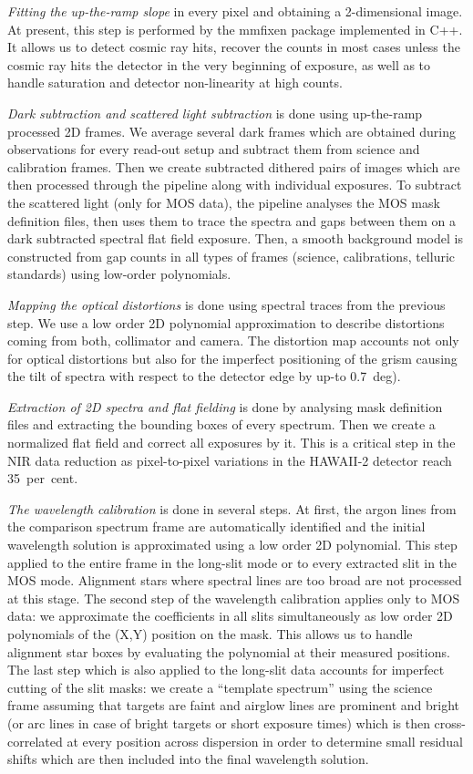 \documentclass[11pt,twoside]{article}
\begin{document}
 \emph{Fitting the up-the-ramp slope} in every pixel and obtaining a
2-dimensional image. At present, this step is performed by the {\sc
mmfixen} package implemented in {\sc C++}. It allows us to detect cosmic ray
hits, recover the counts in most cases unless the cosmic ray hits the
detector in the very beginning of exposure, as well as to handle saturation
and detector non-linearity at high counts.

 \emph{Dark subtraction and scattered light subtraction} is done using
up-the-ramp processed 2D frames.  We average several dark frames which are
obtained during observations for every read-out setup and subtract them from
science and calibration frames.  Then we create subtracted dithered pairs of
images which are then processed through the pipeline along with individual
exposures.  To subtract the scattered light (only for MOS data), the
pipeline analyses the MOS mask definition files, then uses them to trace the
spectra and gaps between them on a dark subtracted spectral flat field
exposure.  Then, a smooth background model is constructed from gap counts in
all types of frames (science, calibrations, telluric standards) using
low-order polynomials.

 \emph{Mapping the optical distortions} is done using spectral traces
from the previous step.  We use a low order 2D polynomial approximation to
describe distortions coming from both, collimator and camera. The distortion
map accounts not only for optical distortions but also for the imperfect
positioning of the grism causing the tilt of spectra with respect to the
detector edge by up-to 0.7~deg).

 \emph{Extraction of 2D spectra and flat fielding} is done by analysing mask
definition files and extracting the bounding boxes of every spectrum.  Then
we create a normalized flat field and correct all exposures by it.  This is
a critical step in the NIR data reduction as pixel-to-pixel variations
in the HAWAII-2 detector reach 35~per~cent.

 \emph{The wavelength calibration} is done in several steps. At first,
the argon lines from the comparison spectrum frame are automatically
identified and the initial wavelength solution is approximated using a low
order 2D polynomial.  This step applied to the entire frame in the long-slit
mode or to every extracted slit in the MOS mode.  Alignment stars where
spectral lines are too broad are not processed at this stage.  The second
step of the wavelength calibration applies only to MOS data: we approximate
the coefficients in all slits simultaneously as low order 2D polynomials of
the (X,Y) position on the mask.  This allows us to handle alignment star
boxes by evaluating the polynomial at their measured positions.  The last
step which is also applied to the long-slit data accounts for imperfect
cutting of the slit masks: we create a ``template spectrum'' using the
science frame assuming that targets are faint and airglow lines are
prominent and bright (or arc lines in case of bright targets or short
exposure times) which is then cross-correlated at every position across
dispersion in order to determine small residual shifts which are then
included into the final wavelength solution.
\end{document}
